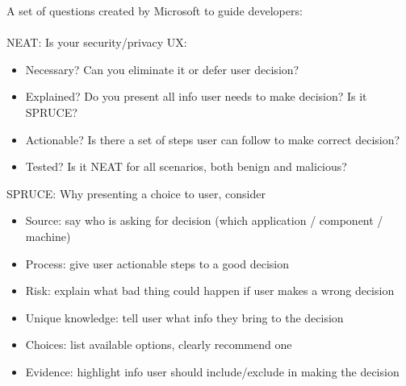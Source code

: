 A set of questions created by Microsoft to guide developers:
\\
\\
NEAT: Is your security/privacy UX:
	\begin{itemize}
		\item Necessary? Can you eliminate it or defer user decision?
		\item Explained? Do you present all info user needs to make decision? Is it SPRUCE?
		\item Actionable? Is there a set of steps user can follow to make correct decision?
		\item Tested? Is it NEAT for all scenarios, both benign and malicious?
	\end{itemize}
SPRUCE: Why presenting a choice to user, consider
	\begin{itemize}
		\item Source: say who is asking for decision (which application / component / machine)
		\item Process: give user actionable steps to a good decision
		\item Risk: explain what bad thing could happen if user makes a wrong decision
		\item Unique knowledge: tell user what info they bring to the decision
		\item Choices: list available options, clearly recommend one
		\item Evidence: highlight info user should include/exclude in making the decision
	\end{itemize}
	
